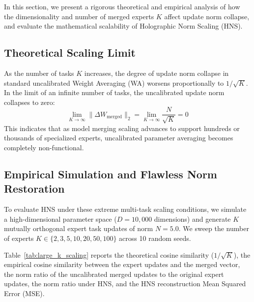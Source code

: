 \documentclass{article}
\theoremstyle{plain}
\theoremstyle{definition}
\theoremstyle{remark}
\begin{document}
In this section, we present a rigorous theoretical and empirical analysis of how the dimensionality and number of merged experts $K$ affect update norm collapse, and evaluate the mathematical scalability of Holographic Norm Scaling (HNS).

\subsection{Theoretical Scaling Limit}
As the number of tasks $K$ increases, the degree of update norm collapse in standard uncalibrated Weight Averaging (WA) worsens proportionally to $1/\sqrt{K}$. In the limit of an infinite number of tasks, the uncalibrated update norm collapses to zero:
\begin{equation}
  \lim_{K \to \infty} \|\Delta W_{\text{merged}}\|_2 = \lim_{K \to \infty} \frac{N}{\sqrt{K}} = 0
\end{equation}
This indicates that as model merging scaling advances to support hundreds or thousands of specialized experts, uncalibrated parameter averaging becomes completely non-functional.

\subsection{Empirical Simulation and Flawless Norm Restoration}
To evaluate HNS under these extreme multi-task scaling conditions, we simulate a high-dimensional parameter space ($D = 10,000$ dimensions) and generate $K$ mutually orthogonal expert task updates of norm $N = 5.0$. We sweep the number of experts $K \in \{2, 3, 5, 10, 20, 50, 100\}$ across 10 random seeds. 

Table~\ref{tab:large_k_scaling} reports the theoretical cosine similarity ($1/\sqrt{K}$), the empirical cosine similarity between the expert updates and the merged vector, the norm ratio of the uncalibrated merged updates to the original expert updates, the norm ratio under HNS, and the HNS reconstruction Mean Squared Error (MSE).
\end{document}
